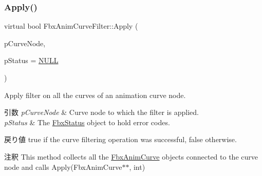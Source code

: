 \mbox{\label{class_fbx_anim_curve_filter_ad042b45c0675278fa49e61739b0825c2}} 
\subsubsection{\texorpdfstring{Apply()}{Apply()}\hspace{0.1cm}{\footnotesize\ttfamily [3/5]}}
{\footnotesize\ttfamily virtual bool Fbx\+Anim\+Curve\+Filter\+::\+Apply (\begin{DoxyParamCaption}\item[{\hyperlink{class_fbx_anim_curve_node}{Fbx\+Anim\+Curve\+Node} \&}]{p\+Curve\+Node,  }\item[{\hyperlink{class_fbx_status}{Fbx\+Status} $\ast$}]{p\+Status = {\ttfamily \hyperlink{fbxarch_8h_a070d2ce7b6bb7e5c05602aa8c308d0c4}{N\+U\+LL}} }\end{DoxyParamCaption})\hspace{0.3cm}{\ttfamily [virtual]}}

Apply filter on all the curves of an animation curve node. 
\begin{DoxyParams}{引数}
{\em p\+Curve\+Node} & Curve node to which the filter is applied. \\
\hline
{\em p\+Status} & The \hyperlink{class_fbx_status}{Fbx\+Status} object to hold error codes. \\
\hline
\end{DoxyParams}
\begin{DoxyReturn}{戻り値}
{\ttfamily true} if the curve filtering operation was successful, {\ttfamily false} otherwise. 
\end{DoxyReturn}
\begin{DoxyRemark}{注釈}
This method collects all the \hyperlink{class_fbx_anim_curve}{Fbx\+Anim\+Curve} objects connected to the curve node and calls Apply(\+Fbx\+Anim\+Curve$\ast$$\ast$, int) 
\end{DoxyRemark}


